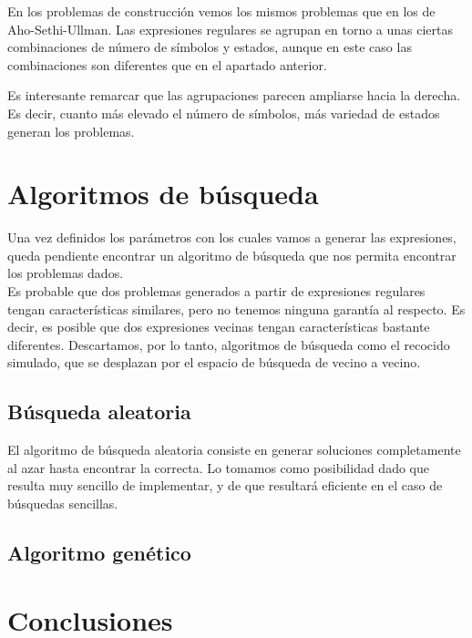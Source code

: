 En los problemas de construcción vemos los mismos problemas que en los de Aho-Sethi-Ullman.
Las expresiones regulares se agrupan en torno a unas ciertas combinaciones de número de símbolos y estados, aunque en este caso las combinaciones son diferentes que en el apartado anterior.


Es interesante remarcar que las agrupaciones parecen ampliarse hacia la derecha.
Es decir, cuanto más elevado el número de símbolos, más variedad de estados generan los problemas.

\section{Algoritmos de búsqueda}

Una vez definidos los parámetros con los cuales vamos a generar las expresiones, queda pendiente encontrar un algoritmo de búsqueda que nos permita encontrar los problemas dados.
\\
Es probable que dos problemas generados a partir de expresiones regulares tengan características similares, pero no tenemos ninguna garantía al respecto.
Es decir, es posible que dos expresiones vecinas tengan características bastante diferentes.
Descartamos, por lo tanto, algoritmos de búsqueda como el recocido simulado, que se desplazan por el espacio de búsqueda de vecino a vecino.

\subsection{Búsqueda aleatoria}

El algoritmo de búsqueda aleatoria consiste en generar soluciones completamente al azar hasta encontrar la correcta.
Lo tomamos como posibilidad dado que resulta muy sencillo de implementar, y de que resultará eficiente en el caso de búsquedas sencillas.


\subsection{Algoritmo genético}


\section{Conclusiones}

